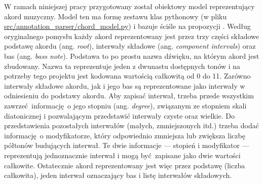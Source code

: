W ramach niniejszej pracy przygotowany został obiektowy model reprezentujący akord muzyczny. Model ten ma formę zestawu klas pythonowy (w pliku \url{src/annotation_parser/chord_model.py}) i bazuje ściśle na propozycji \cite{harte_towards_nodate}. Według oryginalnego pomysłu każdy akord reprezentowany jest przez trzy części składowe podstawę akordu (ang. \emph{root}), interwały składowe (ang. \emph{component intervals}) oraz bas (ang. \emph{bass note}). Podstawa to po prostu nazwa dźwięku, na którym akord jest zbudowany. Nazwa ta reprezentuje jeden z dwunastu dostępnych tonów i na potrzeby tego projektu jest kodowana wartością całkowitą od 0 do 11. Zarówno interwały składowe akordu, jak i jego bas są reprezentowane jako interwały w odniesieniu do podstawy akordu.  Aby zapisać interwał, trzeba przede wszystkim zawrzeć informację o jego stopniu (ang.  \emph{degree}), związanym ze stopniem skali diatonicznej i pozwalającym przedstawić interwały czyste oraz wielkie. Do przedstawienia pozostałych interwałów (małych, zmniejszonych itd.) trzeba dodać informację o modyfikatorze, który odpowiednio zmniejsza lub zwiększa liczbę półtonów budujących interwał. Te dwie informacje --- stopień i modyfikator --- reprezentują jednoznacznie interwał i mogą być zapisane jako dwie wartości całkowite. Ostatecznie akord reprezentowany jest więc przez podstawę (liczba całkowita), jeden interwał oznaczający bas i listę interwałów składowych.

